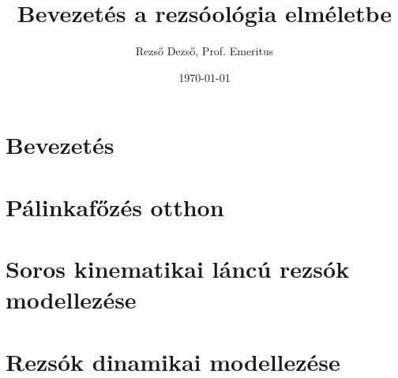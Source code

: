 \documentclass[a4paper,11pt]{book}
\begin{document}
\author{Rezső Dezső, Prof. Emeritus}
\title{Bevezetés a rezsóológia elméletbe}
\date{\today}

\frontmatter
\maketitle
\tableofcontents

\mainmatter




\part{Bevezetés}





\part{Pálinkafőzés otthon}


\part{Soros kinematikai láncú rezsók modellezése}

\part{Rezsók dinamikai modellezése}


\backmatter


\end{document}
